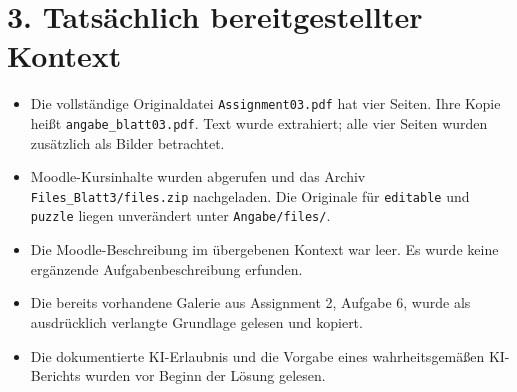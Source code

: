\documentclass[11pt,a4paper]{article}
\begin{document}
\section*{3. Tatsächlich bereitgestellter Kontext}
\begin{itemize}
\item Die vollständige Originaldatei \texttt{Assignment03.pdf} hat vier Seiten. Ihre Kopie heißt \texttt{angabe\_blatt03.pdf}. Text wurde extrahiert; alle vier Seiten wurden zusätzlich als Bilder betrachtet.
\item Moodle-Kursinhalte wurden abgerufen und das Archiv \texttt{Files\_Blatt3/files.zip} nachgeladen. Die Originale für \texttt{editable} und \texttt{puzzle} liegen unverändert unter \texttt{Angabe/files/}.
\item Die Moodle-Beschreibung im übergebenen Kontext war leer. Es wurde keine ergänzende Aufgabenbeschreibung erfunden.
\item Die bereits vorhandene Galerie aus Assignment 2, Aufgabe 6, wurde als ausdrücklich verlangte Grundlage gelesen und kopiert.
\item Die dokumentierte KI-Erlaubnis und die Vorgabe eines wahrheitsgemäßen KI-Berichts wurden vor Beginn der Lösung gelesen.
\end{itemize}
\end{document}
